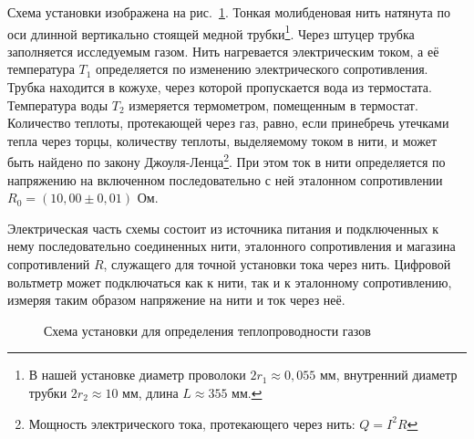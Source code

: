 \documentclass[a4paper,12pt]{article} %
\begin{document}
	Схема установки изображена на рис.~\ref{ris:ustanovka}. Тонкая молибденовая нить натянута по оси длинной вертикально стоящей медной трубки\footnote{В нашей установке диаметр проволоки $2r_1 \approx 0,055$ мм, внутренний диаметр трубки $2r_2 \approx 10$ мм, длина $L \approx 355$ мм.}.
	Через штуцер трубка заполняется исследуемым газом. Нить нагревается электрическим током, а её температура $T_1$ определяется по изменению электрического сопротивления. Трубка находится в кожухе, через которой пропускается вода из термостата. Температура воды $T_2$ измеряется термометром, помещенным в термостат. Количество теплоты, протекающей через газ, равно, если принебречь утечками тепла через торцы, количеству теплоты, выделяемому током в нити, и может быть найдено по закону Джоуля-Ленца\footnote{Мощность электрического тока, протекающего через нить: $Q = I^2 R$}. При этом ток в нити определяется по напряжению на включенном последовательно с ней эталонном сопротивлении $R_0 = (10,00 \pm 0,01)$ Ом.
	
	Электрическая часть схемы состоит из источника питания и подключенных к нему последовательно соединенных нити, эталонного сопротивления и магазина сопротивлений $R$, служащего для точной установки тока через нить. Цифровой вольтметр может подключаться как к нити, так и к эталонному сопротивлению, измеряя таким образом напряжение на нити и ток через неё.
	
\begin{figure}[h]
	\caption{Схема установки для определения теплопроводности газов}
	\label{ris:ustanovka}
\end{figure}
\end{document}
